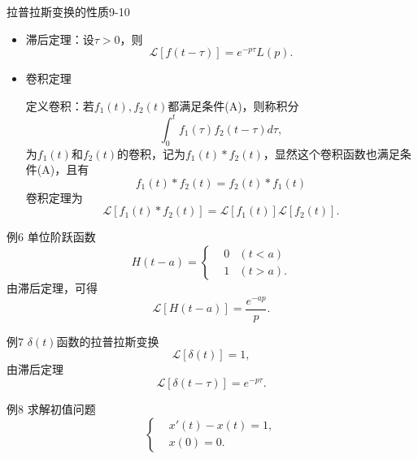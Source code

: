 \documentclass[11pt]{beamer}
\begin{document}
\begin{frame}{拉普拉斯变换的性质9-10}
\begin{itemize}
\item[9] 滞后定理：设$\tau>0$，则
\begin{equation}
\mathscr{L}[ f(t-\tau) ] = e^{-p\tau} L(p).
\end{equation}

\item[10] 卷积定理　

定义卷积：若$f_1(t), f_2(t)$都满足条件(A)，则称积分
\begin{equation}
\int^t_0 f_1(\tau) f_2(t-\tau) d\tau,
\end{equation}
为$f_1(t)$和$f_2(t)$的卷积，记为$f_1(t) * f_2(t)$，显然这个卷积函数也满足条件(A)，且有
\begin{equation}
f_1(t) * f_2(t) = f_2(t) * f_1(t)
\end{equation}
卷积定理为
\begin{equation}
\mathscr{L}[ f_1(t)*f_2(t) ] = \mathscr{L}[f_1(t)] \mathscr{L}[f_2(t)].
\end{equation}
\end{itemize}
\end{frame}

\begin{frame}{例6}
单位阶跃函数
\begin{equation}
H(t-a) = \left\{
\begin{aligned}
& 0  & (t<a) \\
& 1  & (t>a).
\end{aligned}
\right.
\end{equation}
由滞后定理，可得
\begin{equation}
\mathscr{L}[ H(t-a) ] = \frac{ e^{-ap} }{p}.
\end{equation}
\end{frame}

\begin{frame}{例7}
$\delta(t)$函数的拉普拉斯变换
\begin{equation}
\mathscr{L}[ \delta(t) ] = 1,
\end{equation}
由滞后定理
\begin{equation}
\mathscr{L}[ \delta(t-\tau) ] = e^{-p\tau}.
\end{equation}
\end{frame}

\begin{frame}{例8}
求解初值问题
\begin{equation}
\left\{
\begin{aligned}
& x'(t) - x(t) = 1, \\
& x(0) = 0.
\end{aligned}
\right.
\end{equation}

\end{frame}
\end{document}
